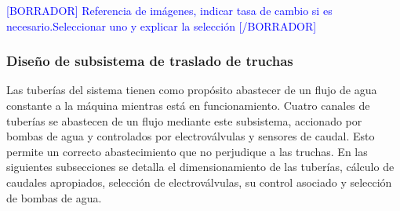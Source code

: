 \begin{itemize}
	\textcolor{blue}{[BORRADOR] Referencia de imágenes, indicar tasa de cambio si es necesario.Seleccionar uno y explicar la selección [/BORRADOR]}	
	
	
	
\end{itemize}




\subsubsection{Diseño de subsistema de traslado de truchas}

Las tuberías del sistema tienen como propósito abastecer de un flujo de agua constante a la máquina mientras está en funcionamiento. Cuatro canales de tuberías se abastecen de un flujo mediante este subsistema, accionado por bombas de agua y controlados por electroválvulas y sensores de caudal. Esto permite un correcto abastecimiento que no perjudique a las truchas. En las siguientes subsecciones se detalla el dimensionamiento de las tuberías, cálculo de caudales apropiados, selección de electroválvulas, su control asociado y selección de bombas de agua.

